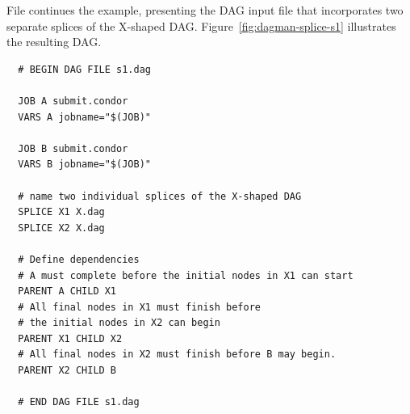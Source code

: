 File  continues the example, presenting
the DAG input file that
incorporates two separate splices of the X-shaped DAG.
Figure~\ref{fig:dagman-splice-s1} illustrates the resulting DAG.

\begin{verbatim}
  # BEGIN DAG FILE s1.dag

  JOB A submit.condor
  VARS A jobname="$(JOB)"

  JOB B submit.condor
  VARS B jobname="$(JOB)"

  # name two individual splices of the X-shaped DAG
  SPLICE X1 X.dag
  SPLICE X2 X.dag

  # Define dependencies
  # A must complete before the initial nodes in X1 can start
  PARENT A CHILD X1
  # All final nodes in X1 must finish before 
  # the initial nodes in X2 can begin
  PARENT X1 CHILD X2
  # All final nodes in X2 must finish before B may begin.
  PARENT X2 CHILD B

  # END DAG FILE s1.dag
\end{verbatim}


